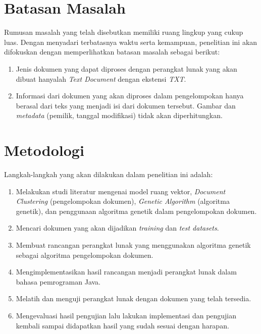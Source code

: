 \section{Batasan Masalah}
\label{sec:batasan}
Rumusan masalah yang telah disebutkan memiliki ruang lingkup yang cukup luas. Dengan menyadari terbatasnya waktu serta kemampuan, penelitian ini akan difokuskan dengan memperlihatkan batasan masalah sebagai berikut:

\begin{enumerate}
	\item Jenis dokumen yang dapat diproses dengan perangkat lunak yang akan dibuat hanyalah \textit{Text Document} dengan ekstensi \textit{TXT}.
	\item Informasi dari dokumen yang akan diproses dalam pengelompokan hanya berasal dari teks yang menjadi isi dari dokumen tersebut. Gambar dan \textit{metadata} (pemilik, tanggal modifikasi) tidak akan diperhitungkan.
\end{enumerate}


\section{Metodologi}
\label{sec:metlit}
Langkah-langkah yang akan dilakukan dalam penelitian ini adalah:

\begin{enumerate}
	\item Melakukan studi literatur mengenai model ruang vektor, {\it Document Clustering} (pengelompokan dokumen), {\it Genetic Algorithm} (algoritma genetik), dan penggunaan algoritma genetik dalam pengelompokan dokumen.
	\item Mencari dokumen yang akan dijadikan {\it training} dan {\it test datasets}.
	\item Membuat rancangan perangkat lunak yang menggunakan algoritma genetik sebagai algoritma pengelompokan dokumen.
	\item Mengimplementasikan hasil rancangan menjadi perangkat lunak dalam bahasa pemrograman Java.
	\item Melatih dan menguji perangkat lunak dengan dokumen yang telah tersedia.
	\item Mengevaluasi hasil pengujian lalu lakukan implementasi dan pengujian kembali sampai didapatkan hasil yang sudah sesuai dengan harapan.
\end{enumerate}

